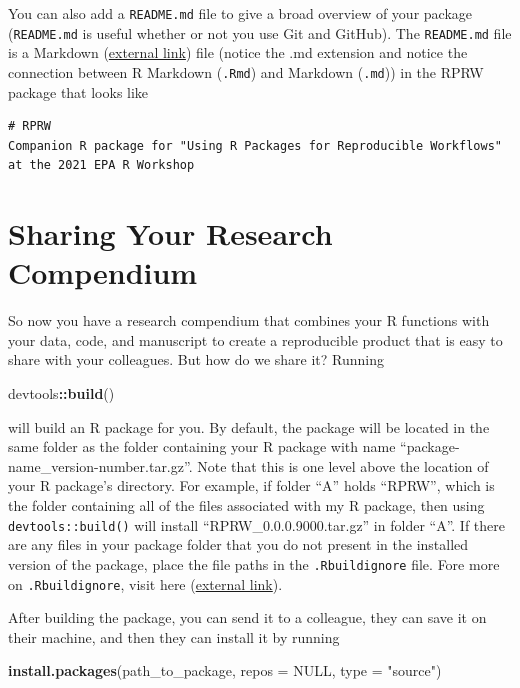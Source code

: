 \documentclass[
]{book}
\newenvironment{Shaded}{\begin{snugshade}}{\end{snugshade}}
\newcommand{\DataTypeTok}[1]{\textcolor[rgb]{0.13,0.29,0.53}{#1}}
\newcommand{\KeywordTok}[1]{\textcolor[rgb]{0.13,0.29,0.53}{\textbf{#1}}}
\newcommand{\NormalTok}[1]{#1}
\newcommand{\OperatorTok}[1]{\textcolor[rgb]{0.81,0.36,0.00}{\textbf{#1}}}
\newcommand{\OtherTok}[1]{\textcolor[rgb]{0.56,0.35,0.01}{#1}}
\newcommand{\StringTok}[1]{\textcolor[rgb]{0.31,0.60,0.02}{#1}}
\begin{document}
You can also add a \texttt{README.md} file to give a broad overview of your package (\texttt{README.md} is useful whether or not you use Git and GitHub). The \texttt{README.md} file is a Markdown (\href{https://www.markdownguide.org/}{external link}) file (notice the .md extension and notice the connection between R Markdown (\texttt{.Rmd}) and Markdown (\texttt{.md})) in the RPRW package that looks like

\begin{verbatim}
# RPRW
Companion R package for "Using R Packages for Reproducible Workflows" at the 2021 EPA R Workshop
\end{verbatim}

\hypertarget{sharing-rc}{%
\section{Sharing Your Research Compendium}\label{sharing-rc}}

So now you have a research compendium that combines your R functions with your data, code, and manuscript to create a reproducible product that is easy to share with your colleagues. But how do we share it? Running

\begin{Shaded}
\begin{Highlighting}[]
\NormalTok{devtools}\OperatorTok{::}\KeywordTok{build}\NormalTok{()}
\end{Highlighting}
\end{Shaded}

will build an R package for you. By default, the package will be located in the same folder as the folder containing your R package with name ``package-name\_version-number.tar.gz''. Note that this is one level above the location of your R package's directory. For example, if folder ``A'' holds ``RPRW'', which is the folder containing all of the files associated with my R package, then using \texttt{devtools::build()} will install ``RPRW\_0.0.0.9000.tar.gz'' in folder ``A''. If there are any files in your package folder that you do not present in the installed version of the package, place the file paths in the \texttt{.Rbuildignore} file. Fore more on \texttt{.Rbuildignore}, visit here (\href{https://r-pkgs.org/package-structure-state.html\#rbuildignore}{external link}).

After building the package, you can send it to a colleague, they can save it on their machine, and then they can install it by running

\begin{Shaded}
\begin{Highlighting}[]
\KeywordTok{install.packages}\NormalTok{(path_to_package, }\DataTypeTok{repos =} \OtherTok{NULL}\NormalTok{, }\DataTypeTok{type =} \StringTok{"source"}\NormalTok{)}
\end{Highlighting}
\end{Shaded}
\end{document}

